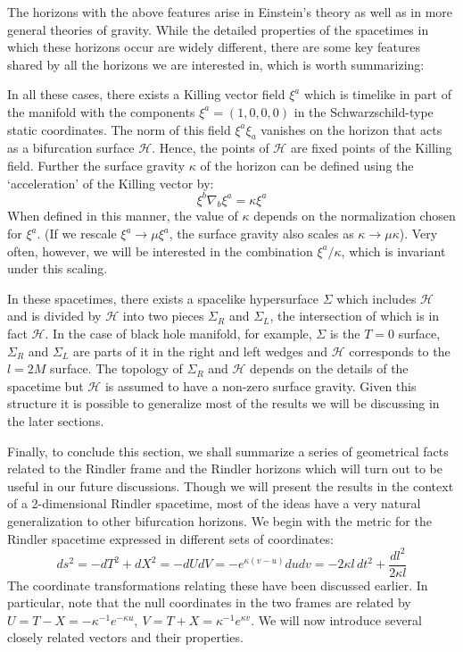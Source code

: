 \documentclass[12pt]{iopart}
\begin{document}
  
  

 The horizons with the above features arise  in Einstein's theory as well as in more general theories of gravity. While the detailed properties of the spacetimes in which these horizons occur are widely different, there are some key features  shared by all the horizons we are interested in, which is worth summarizing:
  
  In all these cases, there exists
 a Killing vector field $\xi^a$ which is timelike  in part of the manifold with the components
  $\xi^a =(1,0,0,0)$ in the Schwarzschild-type static coordinates.
   The norm of this field $\xi^a\xi_a$ vanishes on the horizon that acts as a bifurcation surface $\mathcal{H}$.
  Hence, the points of $\mathcal{H}$ are fixed points of the Killing field. 
  Further the surface gravity $\kappa$ of the horizon can be defined using the `acceleration' of the Killing vector by:
  \begin{equation}
   \xi^b\nabla_b\xi^a=\kappa\xi^a 
   \label{defkappa1}
  \end{equation} 
  When defined in this manner, the value of $\kappa$ depends on the normalization chosen for $\xi^a$. (If we rescale $\xi^a\to \mu\xi^a$, the surface gravity also scales as $\kappa\to\mu\kappa$). Very often, however, we will be interested in the combination $\xi^a/\kappa$, which is invariant under this scaling.
  
  In these spacetimes, there exists a spacelike hypersurface $\Sigma$
  which includes $\mathcal{H}$ and is divided by $\mathcal{H}$ into two pieces $\Sigma_R$ and 
 $ \Sigma_L$, the intersection of which is in fact $\mathcal{H}$. 
  In the case of black hole manifold, for example,  $\Sigma$ is the $T=0$ surface, $\Sigma_R$ and $\Sigma_L$
  are parts of it in the right and left wedges and $\mathcal{H}$ corresponds to the $l=2M$ surface.
  The topology of $\Sigma_R$ and $\mathcal{H}$ depends on the details of the spacetime
  but $\mathcal{H}$ is assumed to have a non-zero surface gravity. Given this structure
  it is possible to generalize most of the results we will be discussing in the later sections.
  
  Finally, to conclude this section, we shall summarize a series of geometrical facts related to the Rindler frame and the Rindler horizons which will turn out to be
  useful in our future discussions. Though we will present the results in the context of a 
  2-dimensional Rindler spacetime, most of the ideas have a very natural generalization to other bifurcation horizons. 
We begin with the metric for the Rindler spacetime expressed in different sets of coordinates:
\begin{equation}
ds^2 =-dT^2 + dX^2 =-dU dV = - e^{\kappa(v-u)}du dv =-2\kappa l \, dt^2 + \frac{dl^2}{2\kappa l} 
\end{equation} 
The coordinate transformations relating these have been discussed earlier.
 In particular, note that 
the null coordinates in the two frames are related by
$U = T-X =-\kappa^{-1} e^{-\kappa u} , \ V =  T + X = \kappa^{-1} e^{\kappa v}$.
We will now introduce several closely related vectors and  their properties.
\end{document}
